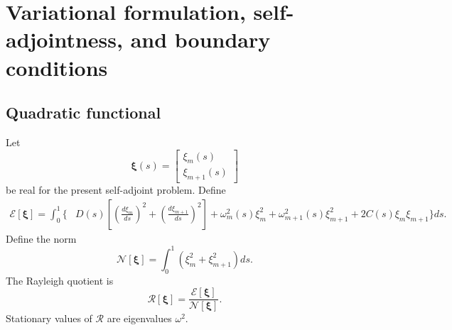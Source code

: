 \section{Variational formulation, self-adjointness, and boundary conditions}
\label{sec:variational_reduced}

\subsection{Quadratic functional}
Let
\begin{equation}
\boldsymbol\xi(s)=\begin{bmatrix}\xi_m(s)\\\xi_{m+1}(s)\end{bmatrix}
\end{equation}
be real for the present self-adjoint problem. Define
\begin{align}
\mathcal E[\boldsymbol\xi]
=\int_0^1\Bigg\{
&D(s)\left[\left(\frac{d\xi_m}{ds}\right)^2
+\left(\frac{d\xi_{m+1}}{ds}\right)^2\right]
+\omega_m^2(s)\xi_m^2
+\omega_{m+1}^2(s)\xi_{m+1}^2
+2C(s)\xi_m\xi_{m+1}
\Bigg\}ds.
\label{eq:reduced_energy}
\end{align}
Define the norm
\begin{equation}
\mathcal N[\boldsymbol\xi]
=\int_0^1\left(\xi_m^2+\xi_{m+1}^2\right)ds.
\label{eq:reduced_norm}
\end{equation}
The Rayleigh quotient is
\begin{equation}
\mathcal R[\boldsymbol\xi]=\frac{\mathcal E[\boldsymbol\xi]}{\mathcal N[\boldsymbol\xi]}.
\label{eq:reduced_rayleigh}
\end{equation}
Stationary values of $\mathcal R$ are eigenvalues $\omega^2$.

